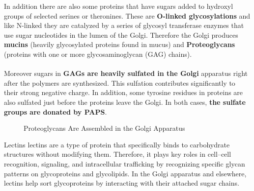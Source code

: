 \documentclass[../main.tex]{subfiles}
\begin{document}
In addition there are also some proteins that have sugars added to hydroxyl groups of selected serines or theronines. These are \textbf{O-linked glycosylations} and like N-linked they are catalyzed by a series of glycosyl transferase enzymes that use sugar nucleotides in the lumen of the Golgi. Therefore the Golgi produces \textbf{mucins} (heavily glycosylated proteins found in mucus) and \textbf{Proteoglycans} (proteins with one or more glycosaminoglycan (GAG) chains). \\
\\
Moreover sugars in \textbf{\gls{GAGs} are heavily sulfated in the Golgi} apparatus right after the polymers are synthesized. This sulfation contributes significantly to their strong negative charge. In addition, some tyrosine residues in proteins are also sulfated just before the proteins leave the Golgi. In both cases, \textbf{the sulfate groups are donated by \gls{PAPS}}.

\begin{figure}[H]
	\centering
	\caption{Proteoglycans Are Assembled in the Golgi Apparatus}
\end{figure}

\begin{DefWithTitle}{Lectins}
		\gls{lectin}s are a type of protein that specifically binds to carbohydrate structures without modifying them. Therefore, it plays key roles in cell–cell recognition, signaling, and intracellular trafficking by recognizing specific glycan patterns on glycoproteins and glycolipids. In the Golgi apparatus and elsewhere, lectins help sort glycoproteins by interacting with their attached sugar chains. 
\end{DefWithTitle}
\end{document}

